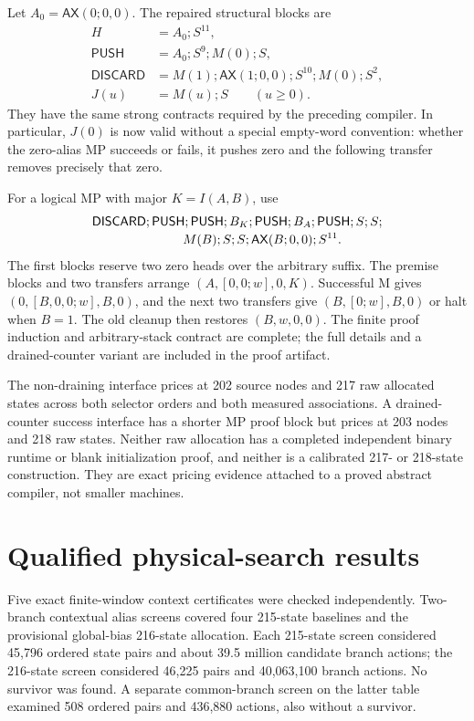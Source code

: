 \documentclass[11pt]{article}
\newcommand{\AX}{\mathsf{AX}}
\newcommand{\PUSH}{\mathsf{PUSH}}
\newcommand{\DISCARD}{\mathsf{DISCARD}}
\begin{document}
Let $A_0=\AX(0;0,0)$. The repaired structural blocks are
\begin{align*}
 H&=A_0;S^{11},\\
 \PUSH&=A_0;S^9;M(0);S,\\
 \DISCARD&=M(1);\AX(1;0,0);S^{10};M(0);S^2,\\
 J(u)&=M(u);S\qquad(u\ge0).
\end{align*}
They have the same strong contracts required by the preceding compiler. In particular, $J(0)$ is now valid without a special empty-word convention: whether the zero-alias MP succeeds or fails, it pushes zero and the following transfer removes precisely that zero.

For a logical MP with major $K=I(A,B)$, use
\begin{align*}
 &\DISCARD;\PUSH;\PUSH;B_K;\PUSH;B_A;\PUSH;S;S;\\[-2pt]
 &\hspace{25mm}M(B);S;S;\AX(B;0,0);S^{11}.
\end{align*}
The first blocks reserve two zero heads over the arbitrary suffix. The premise blocks and two transfers arrange $(A,[0,0;w],0,K)$. Successful M gives $(0,[B,0,0;w],B,0)$, and the next two transfers give $(B,[0;w],B,0)$ or halt when $B=1$. The old cleanup then restores $(B,w,0,0)$. The finite proof induction and arbitrary-stack contract are complete; the full details and a drained-counter variant are included in the proof artifact.

The non-draining interface prices at 202 source nodes and 217 raw allocated states across both selector orders and both measured associations. A drained-counter success interface has a shorter MP proof block but prices at 203 nodes and 218 raw states. Neither raw allocation has a completed independent binary runtime or blank initialization proof, and neither is a calibrated 217- or 218-state construction. They are exact pricing evidence attached to a proved abstract compiler, not smaller machines.

\section{Qualified physical-search results}
Five exact finite-window context certificates were checked independently. Two-branch contextual alias screens covered four 215-state baselines and the provisional global-bias 216-state allocation. Each 215-state screen considered 45,796 ordered state pairs and about 39.5 million candidate branch actions; the 216-state screen considered 46,225 pairs and 40,063,100 branch actions. No survivor was found. A separate common-branch screen on the latter table examined 508 ordered pairs and 436,880 actions, also without a survivor.
\end{document}
